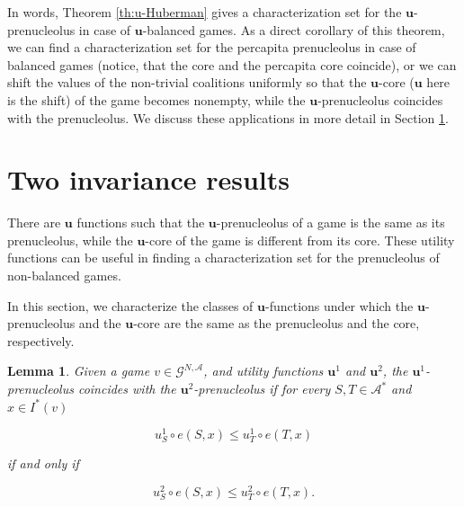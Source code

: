\documentclass[a4paper,12pt]{article}
\newtheorem{lemma}[theorem]{Lemma}
\theoremstyle{definition}
\theoremstyle{remark}
\begin{document}
In words, Theorem \ref{th:u-Huberman} gives a characterization set for the $\mathbf{u}$-prenucleolus in case of $\mathbf{u}$-balanced games. As a direct corollary of this theorem, we can find a characterization set for the percapita prenucleolus in case of balanced games (notice, that the core and the percapita core coincide), or we can shift the values of the non-trivial coalitions uniformly so that the $\mathbf{u}$-core ($\mathbf{u}$ here is the shift) of the game becomes nonempty, while the $\mathbf{u}$-prenucleolus coincides with the prenucleolus. We discuss these applications in more detail in Section \ref{sec:invariance}.





\section{Two invariance results}\label{sec:invariance}

There are $\mathbf{u}$ functions such that  the $\mathbf{u}$-prenucleolus of a game is the same as its prenucleolus, while the $\mathbf{u}$-core of the game is different from its core. These utility functions can be useful in finding a characterization set for the prenucleolus of non-balanced games. %

In this section, we characterize the classes of $\mathbf{u}$-functions under which the $\mathbf{u}$-prenucleolus and the $\mathbf{u}$-core are the same as the prenucleolus and the core, respectively.

\begin{lemma}\label{lemma:invariance:prenuc}
Given a game $v \in \mathcal{G}^{N,\mathcal{A}}$, and utility functions $\mathbf{u}^1$ and $\mathbf{u}^2$, the $\mathbf{u}^1$-prenucleolus coincides with the $\mathbf{u}^2$-prenucleolus if for every $S, T \in \mathcal{A}^*$ and $x\in I^*(v)$

\begin{equation} \label{eq:lemma_normal}
u^1_S \circ e(S, x) \leq u^1_T \circ e(T, x) 
\end{equation}

\noindent if and only if

\begin{equation} \label{eq:lemma_u}
u^2_S \circ e(S, x) \leq u^2_T \circ e(T, x) .
\end{equation}
\end{lemma}
\end{document}
